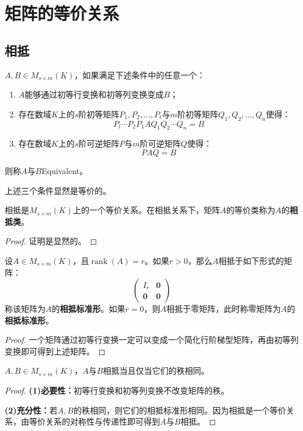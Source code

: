 \section{矩阵的等价关系}

\subsection{相抵}
\begin{definition}
	$A,B\in M_{s\times m}(K)$，如果满足下述条件中的任意一个：
	\begin{enumerate}
		\item $A$能够通过初等行变换和初等列变换变成$B$；
		\item 存在数域$K$上的$s$阶初等矩阵$P_1,P_2,\dots,P_t$与$m$阶初等矩阵$Q_1,Q_2,\dots,Q_n$使得：
		\begin{equation*}
			P_t\cdots P_2P_1AQ_1Q_2\cdots Q_n=B
		\end{equation*}
		\item 存在数域$K$上的$s$阶可逆矩阵$P$与$m$阶可逆矩阵$Q$使得：
		\begin{equation*}
			PAQ=B
		\end{equation*}
	\end{enumerate}
	则称$A$与$B$\gls{Equivalent}。
\end{definition}
上述三个条件显然是等价的。
\begin{theorem}
	相抵是$M_{s\times m}(K)$上的一个等价关系。在相抵关系下，矩阵$A$的等价类称为$A$的\textbf{相抵类}。
\end{theorem}
\begin{proof}
	证明是显然的。
\end{proof}
\begin{theorem}
	设$A\in M_{s\times m}(K)$，且$\operatorname{rank}(A)=r$。如果$r>0$，那么$A$相抵于如下形式的矩阵：
	\begin{equation*}
		\begin{pmatrix}
			I_r & \mathbf{0} \\
			\mathbf{0} & \mathbf{0}
		\end{pmatrix}
	\end{equation*}
	称该矩阵为$A$的\textbf{相抵标准形}。如果$r=0$，则$A$相抵于零矩阵，此时称零矩阵为$A$的\textbf{相抵标准形}。
\end{theorem}
\begin{proof}
	一个矩阵通过初等行变换一定可以变成一个简化行阶梯型矩阵，再由初等列变换即可得到上述矩阵。
\end{proof}
\begin{theorem}[相抵的完全不变量]
	$A,B\in M_{s\times m}(K)$，$A$与$B$相抵当且仅当它们的秩相同。
\end{theorem}
\begin{proof}
	\textbf{(1)必要性：}初等行变换和初等列变换不改变矩阵的秩。\par
	\textbf{(2)充分性：}若$A,B$的秩相同，则它们的相抵标准形相同。因为相抵是一个等价关系，由等价关系的对称性与传递性即可得到$A$与$B$相抵。
\end{proof}

